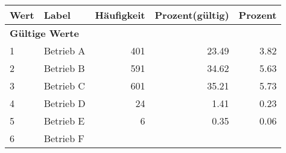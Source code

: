      \begin{longtable}{lXrrr}
     \toprule
     \textbf{Wert} & \textbf{Label} & \textbf{Häufigkeit} & \textbf{Prozent(gültig)} & \textbf{Prozent} \\
     \endhead
     \midrule
     \multicolumn{5}{l}{\textbf{Gültige Werte}}\\

     1 &
     \multicolumn{1}{X}{ Betrieb A   } &


       \num{401} &
       \num[round-mode=places,round-precision=2]{23,49} &
         \num[round-mode=places,round-precision=2]{3,82} \\

     2 &
     \multicolumn{1}{X}{ Betrieb B   } &


       \num{591} &
       \num[round-mode=places,round-precision=2]{34,62} &
         \num[round-mode=places,round-precision=2]{5,63} \\

     3 &
     \multicolumn{1}{X}{ Betrieb C   } &


       \num{601} &
       \num[round-mode=places,round-precision=2]{35,21} &
         \num[round-mode=places,round-precision=2]{5,73} \\

     4 &
     \multicolumn{1}{X}{ Betrieb D   } &


       \num{24} &
       \num[round-mode=places,round-precision=2]{1,41} &
         \num[round-mode=places,round-precision=2]{0,23} \\

     5 &
     \multicolumn{1}{X}{ Betrieb E   } &


       \num{6} &
       \num[round-mode=places,round-precision=2]{0,35} &
         \num[round-mode=places,round-precision=2]{0,06} \\

     6 &
     \multicolumn{1}{X}{ Betrieb F   } &



\end{longtable}

